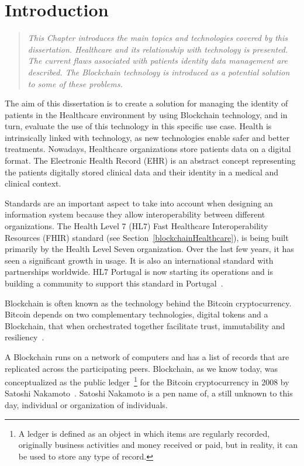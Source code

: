 \chapter{Introduction}
\label{introduction}

\begin{quote} 
  \emph{This Chapter introduces the main topics and technologies covered by
  this dissertation. Healthcare and its relationship with technology is
  presented. The current flaws associated with patients identity data
  management are described. The Blockchain technology is introduced as a
  potential solution to some of these problems.} 
\end{quote}

The aim of this dissertation is to create a solution for managing the identity
of patients in the Healthcare environment by using Blockchain technology, and
in turn, evaluate the use of this technology in this specific use case.  Health
is intrinsically linked with technology, as new technologies enable safer and
better treatments. Nowadays, Healthcare organizations store patients data on a
digital format. The Electronic Health Record (EHR) is an abstract concept
representing the patients digitally stored clinical data and their identity in
a medical and clinical context.

Standards are an important aspect to take into account when designing an
information system because they allow interoperability between different
organizations. The Health Level 7 (HL7) Fast Healthcare Interoperability
Resources (FHIR) standard (see Section~\ref{blockchainHealthcare}), is being
built primarily by the Health Level Seven organization. Over the last few
years, it has seen a significant growth in usage. It is also an international
standard with partnerships worldwide. HL7 Portugal is now starting its
operations and is building a community to support this standard in
Portugal~\cite{HealthLevel7}.

Blockchain is often known as the technology behind the Bitcoin cryptocurrency.
Bitcoin depends on two complementary technologies, digital tokens and a
Blockchain, that when orchestrated together facilitate trust, immutability and
resiliency~\cite{Evans2016}.

A Blockchain runs on a network of computers and has a list of records that are
replicated across the participating peers. Blockchain, as we know today, was
conceptualized as the public ledger~\footnote{A ledger is defined as an object
in which items are regularly recorded, originally business activities and money
received or paid, but in reality, it can be used to store any type of record.}
for the Bitcoin cryptocurrency in 2008 by Satoshi Nakamoto~\cite{Nakamoto2008}.
Satoshi Nakamoto is a pen name of, a still unknown to this day, individual or
organization of individuals.

